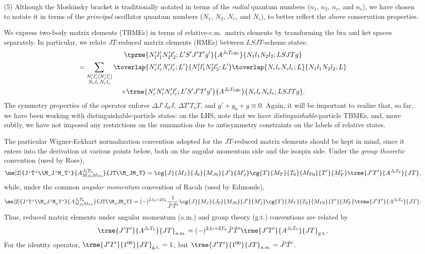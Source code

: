 \documentclass[aps,groupedaddress,onecolumn,11pt,floatfix]{revtex4}
\newcommand{\mathds}{}
\newcommand{\Nr}{N_r}
\newcommand{\Nc}{N_c}
\newcommand{\nr}{n_r}
\newcommand{\nc}{n_c}
\newcommand{\lr}{l_r}
\newcommand{\lc}{l_c}
\newcommand{\unity}{\mathds{1}}
\begin{document}
(5) Although the 
Moshinsky bracket is traditionally notated in terms of the
\textit{radial} quantum numbers ($n_1$, $n_2$, $\nr$, and $\nc$), we have
chosen to notate it in terms of the \textit{principal} oscillator
quantum numbers ($N_1$, $N_2$, $\Nr$, and $\Nc$), to better reflect the above
conservation properties.


We express two-body matrix
elements (TBMEs) in terms of relative-c.m.~matrix elements by
transforming the bra and ket spaces separately.
In particular, we relate $JT$-reduced
matrix elements (RMEs) between $LSJT$-scheme states:
\begin{multline}
\label{eqn-moshinsky-xform-op-dist-redundant}
\tprme{N_1' l_1' N_2' l_2';L'S'J'T'g'}{A^{J_0T_0g_0}}{N_1 l_1 N_2 l_2;LSJTg}
\\
=\sum_{\substack{\Nr'\lr'[\Nc'\lc']\\ \Nr\lr\Nc\lc}}
\toverlap{\Nr'\lr'\Nc'\lc';L'}{N_1'l_1'N_2'l_2';L'}
\toverlap{\Nr\lr\Nc\lc;L}{N_1l_1N_2l_2;L}
\\
\times
\trme{\Nr' \Nr' \Nc' \lc';L'S'J'T'g'}{A^{J_0T_0g_0}}{\Nr \lr \Nc \lc; LSJTg}.
\end{multline}
The symmetry properties of the operator enforce $\Delta{J'J_0J}$,
$\Delta{T'T_oT}$, and $g'+g_0+g\cong0$.
 Again, it will be important to realize that, so far,
we have been working with distinguishable-particle states: on the LHS, note that we have
\textit{distinguishable}-particle TBMEs, and, more subtly, we have not
imposed any restrictions on the summation due to antisymmetry
constraints on the labels of relative states.

The particular
Wigner-Eckhart normalization convention adopted for the $JT$-reduced
matrix elements should
be kept in mind, since it enters into the derivation at various points
below, both on the angular momentum side and the isospin side.  Under
the \textit{group theoretic} convention (used by Rose),
\begin{equation}
\label{eqn-we-group}
\me[2]{J'T'\\M_J'M_T'}{A^{J_0T_0}_{M_{J0}M_{T0}}}{JT\\M_JM_T}
=
\cg{J}{M_J}{J_0}{M_{J0}}{J'}{M_J'}
\cg{T}{M_T}{T_0}{M_{T0}}{T'}{M_T'}
\trme{J'T'}{A^{J_0T_0}}{JT},
\end{equation}
 while, under the common \textit{angular momentum} convention of
 Racah (used by Edmonds),
\begin{equation}
\label{eqn-we-racah}
\me[2]{J'T'\\M_J'M_T'}{A^{J_0T_0}_{M_{J0}M_{T0}}}{JT\\M_JM_T}
=
(-)^{2J_0+2T_0} \frac1{\hat{J}'\hat{T}'}
\cg{J}{M_J}{J_0}{M_{J0}}{J'}{M_J'}
\cg{T}{M_T}{T_0}{M_{T0}}{T'}{M_T'}
\trme{J'T'}{A^{J_0T_0}}{JT}.
\end{equation}
Thus, reduced matrix elements under angular momentum (a.m.) and group
theory (g.t.) conventions are related by
\begin{equation}
\trme{J'T'}{A^{J_0T_0}}{JT}_{\text{a.m.}}=
(-)^{2J_0+2T_0} {\hat{J}'\hat{T}'}
\trme{J'T'}{A^{J_0T_0}}{JT}_{\text{g.t.}}.
\end{equation}
For the identity operator, 
$\trme{J'T'}{\unity^{00}}{JT}_{\text{g.t.}}= 1$, but
$\trme{J'T'}{\unity^{00}}{JT}_{\text{a.m.}}= {\hat{J}'\hat{T}'}$.
\end{document}
